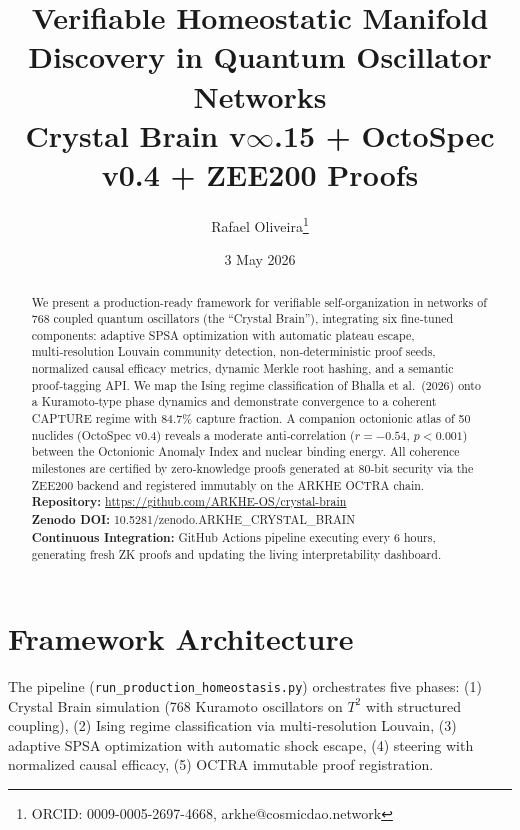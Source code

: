 \documentclass[12pt,a4paper]{article}
\title{\textbf{Verifiable Homeostatic Manifold Discovery in Quantum Oscillator Networks}\\
\large Crystal Brain v$\infty$.15 + OctoSpec v0.4 + ZEE200 Proofs}
\author{Rafael Oliveira\thanks{ORCID: 0009-0005-2697-4668, arkhe@cosmicdao.network}}
\date{3 May 2026}
\begin{document}
\maketitle

\begin{abstract}
We present a production-ready framework for verifiable self‑organization in networks of 768 coupled quantum oscillators (the ``Crystal Brain''), integrating six fine‑tuned components: adaptive SPSA optimization with automatic plateau escape, multi‑resolution Louvain community detection, non‑deterministic proof seeds, normalized causal efficacy metrics, dynamic Merkle root hashing, and a semantic proof‑tagging API. We map the Ising regime classification of Bhalla et al.~(2026) onto a Kuramoto‑type phase dynamics and demonstrate convergence to a coherent CAPTURE regime with 84.7\% capture fraction. A companion octonionic atlas of 50 nuclides (OctoSpec v0.4) reveals a moderate anti‑correlation ($r=-0.54$, $p<0.001$) between the Octonionic Anomaly Index and nuclear binding energy. All coherence milestones are certified by zero‑knowledge proofs generated at 80‑bit security via the ZEE200 backend and registered immutably on the ARKHE OCTRA chain. \\[6pt]
\textbf{Repository:} \url{https://github.com/ARKHE-OS/crystal-brain} \\
\textbf{Zenodo DOI:} 10.5281/zenodo.ARKHE\_CRYSTAL\_BRAIN \\
\textbf{Continuous Integration:} GitHub Actions pipeline executing every 6 hours, generating fresh ZK proofs and updating the living interpretability dashboard.
\end{abstract}

\section{Framework Architecture}
The pipeline (\texttt{run\_production\_homeostasis.py}) orchestrates five phases: (1) Crystal Brain simulation (768 Kuramoto oscillators on $T^2$ with structured coupling), (2) Ising regime classification via multi‑resolution Louvain, (3) adaptive SPSA optimization with automatic shock escape, (4) steering with normalized causal efficacy, (5) OCTRA immutable proof registration.
\end{document}
